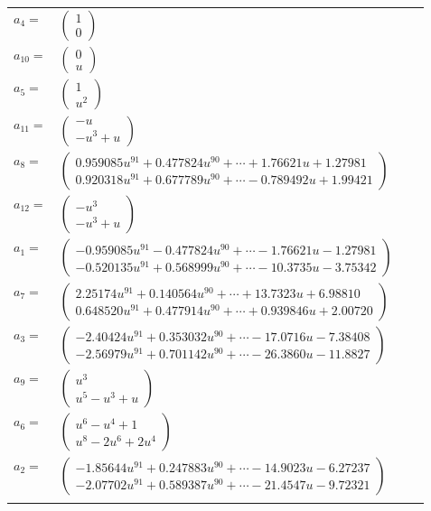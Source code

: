 \documentclass[1p]{elsarticle_modified}
\theoremstyle{definition}
\begin{document}
\begin{tabular}{m{7pt} m{180pt} m{7pt} m{180pt} }
\flushright $a_{4}=$&$\begin{pmatrix}1\\0\end{pmatrix}$ \\
\flushright $a_{10}=$&$\begin{pmatrix}0\\u\end{pmatrix}$ \\
\flushright $a_{5}=$&$\begin{pmatrix}1\\u^2\end{pmatrix}$ \\
\flushright $a_{11}=$&$\begin{pmatrix}- u\\- u^3+u\end{pmatrix}$ \\
\flushright $a_{8}=$&$\begin{pmatrix}0.959085 u^{91}+0.477824 u^{90}+\cdots+1.76621 u+1.27981\\0.920318 u^{91}+0.677789 u^{90}+\cdots-0.789492 u+1.99421\end{pmatrix}$ \\
\flushright $a_{12}=$&$\begin{pmatrix}- u^3\\- u^3+u\end{pmatrix}$ \\
\flushright $a_{1}=$&$\begin{pmatrix}-0.959085 u^{91}-0.477824 u^{90}+\cdots-1.76621 u-1.27981\\-0.520135 u^{91}+0.568999 u^{90}+\cdots-10.3735 u-3.75342\end{pmatrix}$ \\
\flushright $a_{7}=$&$\begin{pmatrix}2.25174 u^{91}+0.140564 u^{90}+\cdots+13.7323 u+6.98810\\0.648520 u^{91}+0.477914 u^{90}+\cdots+0.939846 u+2.00720\end{pmatrix}$ \\
\flushright $a_{3}=$&$\begin{pmatrix}-2.40424 u^{91}+0.353032 u^{90}+\cdots-17.0716 u-7.38408\\-2.56979 u^{91}+0.701142 u^{90}+\cdots-26.3860 u-11.8827\end{pmatrix}$ \\
\flushright $a_{9}=$&$\begin{pmatrix}u^3\\u^5- u^3+u\end{pmatrix}$ \\
\flushright $a_{6}=$&$\begin{pmatrix}u^6- u^4+1\\u^8-2 u^6+2 u^4\end{pmatrix}$ \\
\flushright $a_{2}=$&$\begin{pmatrix}-1.85644 u^{91}+0.247883 u^{90}+\cdots-14.9023 u-6.27237\\-2.07702 u^{91}+0.589387 u^{90}+\cdots-21.4547 u-9.72321\end{pmatrix}$\\&\end{tabular}
\end{document}
